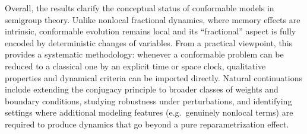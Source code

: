 \documentclass[preprint,12pt]{elsarticle}
\begin{document}
Overall, the results clarify the conceptual status of conformable models in semigroup theory. Unlike nonlocal fractional dynamics, where memory effects are intrinsic, conformable evolution remains local and its ``fractional'' aspect is fully encoded by deterministic changes of variables. From a practical viewpoint, this provides a systematic methodology: whenever a conformable problem can be reduced to a classical one by an explicit time or space clock, qualitative properties and dynamical criteria can be imported directly. Natural continuations include extending the conjugacy principle to broader classes of weights and boundary conditions, studying robustness under perturbations, and identifying settings where additional modeling features (e.g.\ genuinely nonlocal terms) are required to produce dynamics that go beyond a pure reparametrization effect.
\end{document}
